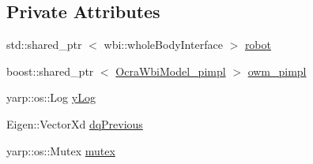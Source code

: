 \subsection*{\-Private \-Attributes}
\begin{DoxyCompactItemize}
\item 
std\-::shared\-\_\-ptr\*
$<$ wbi\-::whole\-Body\-Interface $>$ \hyperlink{classocra__icub_1_1OcraWbiModel_ae377f000580656227fa9ef69f2f2e71d}{robot}
\item 
boost\-::shared\-\_\-ptr\*
$<$ \hyperlink{structOcraWbiModel_1_1OcraWbiModel__pimpl}{\-Ocra\-Wbi\-Model\-\_\-pimpl} $>$ \hyperlink{classocra__icub_1_1OcraWbiModel_ab649cb769ca4edd345b3c09c43a69bde}{owm\-\_\-pimpl}
\item 
yarp\-::os\-::\-Log \hyperlink{classocra__icub_1_1OcraWbiModel_a047fe9f9a96794af218ea844f09cd402}{y\-Log}
\item 
\-Eigen\-::\-Vector\-Xd \hyperlink{classocra__icub_1_1OcraWbiModel_a81cbe15f478202b6327343395e10637b}{dq\-Previous}
\item 
yarp\-::os\-::\-Mutex \hyperlink{classocra__icub_1_1OcraWbiModel_ae843ccb96192d22e61438ecd1bb0e29d}{mutex}
\end{DoxyCompactItemize}


